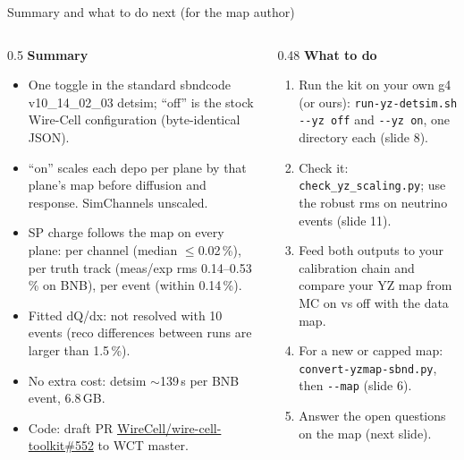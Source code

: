 \documentclass[aspectratio=169,10pt]{beamer}
\newcommand{\code}[1]{\texttt{#1}}
\begin{document}
\begin{frame}{Summary and what to do next (for the map author)}
\small
\begin{columns}[T]
\begin{column}{0.5\textwidth}
\textbf{Summary}
\begin{itemize}
\item One toggle in the standard sbndcode v10\_14\_02\_03 detsim; ``off'' is the stock Wire-Cell configuration (byte-identical JSON).
\item ``on'' scales each depo per plane by that plane's map before diffusion and response. SimChannels unscaled.
\item SP charge follows the map on every plane: per channel (median $\le$0.02\,\%), per truth track (meas/exp rms 0.14--0.53\,\% on BNB), per event (within 0.14\,\%).
\item Fitted dQ/dx: not resolved with 10 events (reco differences between runs are larger than 1.5\,\%).
\item No extra cost: detsim $\sim$139\,s per BNB event, 6.8\,GB.
\item Code: draft PR \href{https://github.com/WireCell/wire-cell-toolkit/pull/552}{WireCell/wire-cell-toolkit\#552} to WCT master.
\end{itemize}
\end{column}
\begin{column}{0.48\textwidth}
\textbf{What to do}
\begin{enumerate}
\item Run the kit on your own g4 (or ours): \code{run-yz-detsim.sh -{}-yz off} and \code{-{}-yz on}, one directory each (slide 8).
\item Check it: \code{check\_yz\_scaling.py}; use the robust rms on neutrino events (slide 11).
\item Feed both outputs to your calibration chain and compare your YZ map from MC on vs off with the data map.
\item For a new or capped map: \code{convert-yzmap-sbnd.py}, then \code{-{}-map} (slide 6).
\item Answer the open questions on the map (next slide).
\end{enumerate}
\end{column}
\end{columns}
\end{frame}
\end{document}
